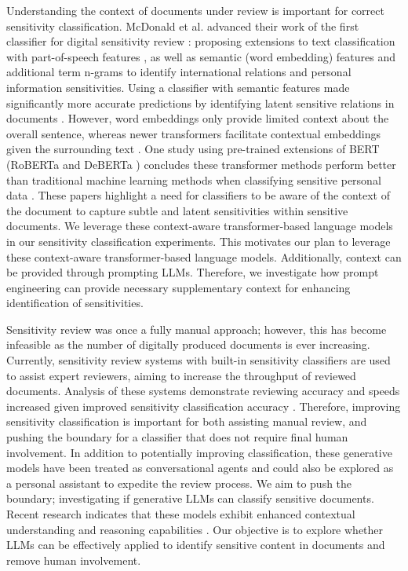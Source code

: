 Understanding the context of documents under review is important for correct sensitivity classification. McDonald et al. advanced their work of the first classifier for digital sensitivity review \cite{mcdonald2014towards}: proposing extensions to text classification with part-of-speech features \cite{mcdonald2015using}, as well as semantic (word embedding) features and additional term n-grams \cite{mcdonald2017enhancing} to identify international relations and personal information sensitivities. Using a classifier with semantic features made significantly more accurate predictions by identifying latent sensitive relations in documents \cite{mcdonald2017enhancing}. However, word embeddings only provide limited context about the overall sentence, whereas newer transformers facilitate contextual embeddings given the surrounding text \cite{noh2021improved}. One study using pre-trained extensions of BERT \cite{devlin2018bert} (RoBERTa \cite{liu2019roberta} and DeBERTa \cite{he2020deberta}) concludes these transformer methods perform better than traditional machine learning methods when classifying sensitive personal data \cite{gambarelli2023your}. These papers highlight a need for classifiers to be aware of the context of the document to capture subtle and latent sensitivities within sensitive documents. We leverage these context-aware transformer-based language models in our sensitivity classification experiments. This motivates our plan to leverage these context-aware transformer-based language models. Additionally, context can be provided through prompting LLMs. Therefore, we investigate how prompt engineering can provide necessary supplementary context for enhancing identification of sensitivities.

Sensitivity review was once a fully manual approach; however, this has become infeasible as the number of digitally produced documents is ever increasing. Currently, sensitivity review systems with built-in sensitivity classifiers are used to assist expert reviewers, aiming to increase the throughput of reviewed documents. Analysis of these systems demonstrate reviewing accuracy and speeds increased given improved sensitivity classification accuracy \cite{mcdonald2020accuracy}. Therefore, improving sensitivity classification is important for both assisting manual review, and pushing the boundary for a classifier that does not require final human involvement. In addition to potentially improving classification, these generative models have been treated as conversational agents \cite{pereira2023here} and could also be explored as a personal assistant to expedite the review process. We aim to push the boundary; investigating if generative LLMs can classify sensitive documents. Recent research indicates that these models exhibit enhanced contextual understanding and reasoning capabilities \cite{adiwardana2020towards}. Our objective is to explore whether LLMs can be effectively applied to identify sensitive content in documents and remove human involvement.


